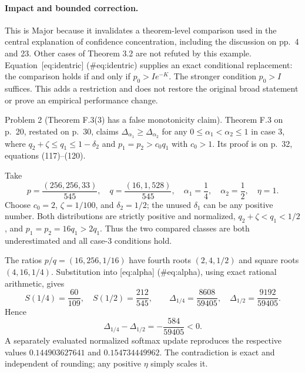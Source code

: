 \documentclass[10pt]{article}
\begin{document}
\paragraph*{Impact and bounded correction.}\mbox{}\par
This is Major because it invalidates a theorem-level comparison used in the central explanation of confidence concentration, including the discussion on pp. 4 and 23. Other cases of Theorem 3.2 are not refuted by this example. Equation [eq:identric] (\#eq:identric) supplies an exact conditional replacement: the comparison holds if and only if \(p_0>Ie^{-K}\). The stronger condition \(p_0>I\) suffices. This adds a restriction and does not restore the original broad statement or prove an empirical performance change.\par
Problem 2 (Theorem F.3(3) has a false monotonicity claim).  Theorem F.3 on p. 20, restated on p. 30, claims \(\Delta_{\alpha_1}\ge\Delta_{\alpha_2}\) for any \(0\le\alpha_1<\alpha_2\le1\) in case 3, where \(q_2+\zeta\le q_1\le1-\delta_2\) and \(p_1=p_2>c_0q_1\) with \(c_0>1\). Its proof is on p. 32, equations (117)–(120).\par
Take \[p=\frac{(256,256,33)}{545},\quad
q=\frac{(16,1,528)}{545},\quad
\alpha_1=\frac14,\quad\alpha_2=\frac12,\quad\eta=1.\] Choose \(c_0=2\), \(\zeta=1/100\), and \(\delta_2=1/2\); the unused \(\delta_1\) can be any positive number. Both distributions are strictly positive and normalized, \(q_2+\zeta<q_1<1/2\), and \(p_1=p_2=16q_1>2q_1\). Thus the two compared classes are both underestimated and all case-3 conditions hold.\par
The ratios \(p/q=(16,256,1/16)\) have fourth roots \((2,4,1/2)\) and square roots \((4,16,1/4)\). Substitution into [eq:alpha] (\#eq:alpha), using exact rational arithmetic, gives \[S(1/4)=\frac{60}{109},\quad S(1/2)=\frac{212}{545},\qquad
\Delta_{1/4}=\frac{8608}{59405},\quad
\Delta_{1/2}=\frac{9192}{59405}.\] Hence \[\Delta_{1/4}-\Delta_{1/2}=-\frac{584}{59405}<0.\] A separately evaluated normalized softmax update reproduces the respective values \(0.144903627641\) and \(0.154734449962\). The contradiction is exact and independent of rounding; any positive \(\eta\) simply scales it.\par
\end{document}
